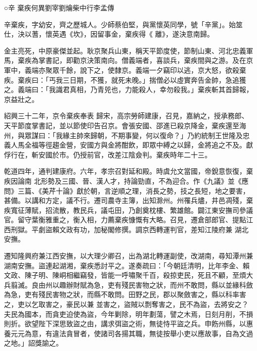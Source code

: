 
\begin{pinyinscope}

 ○辛
 棄疾何異劉宰劉爚柴中行李孟傳



 辛棄疾，字幼安，齊之歷城人。少師蔡伯堅，與黨懷英同學，號「辛黨」。始筮仕，決以蓍，懷英遇《坎》，因留事金，棄疾得《
 離》，遂決意南歸。



 金主亮死，中原豪傑並起。耿京聚兵山東，稱天平節度使，節制山東、河北忠義軍馬，棄疾為掌書記，即勸京決策南向。僧義端者，喜談兵，棄疾間與之游。及在京軍中，義端亦聚眾千餘，說下之，使隸京。義端一夕竊印以逃，京大怒，欲殺棄疾。棄疾曰：「丐我三日期，不獲，就死未晚。」揣僧必以虛實奔告金帥，急追獲之。義端曰：「我識君真相，乃青兕也，力能殺人，幸勿殺我。」棄疾斬其首歸報，京益壯之。



 紹興三十二年，京令棄疾奉表
 歸宋，高宗勞師建康，召見，嘉納之，授承務郎、天平節度掌書記，並以節使印告召京。會張安國、邵進已殺京降金，棄疾還至海州，與眾謀曰：「我緣主帥來歸朝，不期事變，何以復命？」乃約統制王世隆及忠義人馬全福等徑趨金營，安國方與金將酣飲，即眾中縛之以歸，金將追之不及。獻俘行在，斬安國於市。仍授前官，改差江陰僉判。棄疾時年二十三。



 乾道四年，通判建康府。六年，孝宗召對延和殿。時虞允文當國，帝銳意恢復，棄疾因論南
 北形勢及三國、晉、漢人才，持論勁直，不為迎合。作《九議》並《應問》三篇、《美芹十論》獻於朝，言逆順之理，消長之勢，技之長短，地之要害，甚備。以講和方定，議不行。遷司農寺主簿，出知滁州。州罹兵燼，井邑凋殘，棄疾寬征薄賦，招流散，教民兵，議屯田，乃創奠枕樓、繁雄館。闢江東安撫司參議官。留守葉衡雅重之，衡入相，力薦棄疾慷慨有大略。召見，遷倉部郎官、提點江西刑獄。平劇盜賴文政有功，加秘閣修撰。調京西轉運判官，差知江陵府兼
 湖北安撫。



 遷知隆興府兼江西安撫，以大理少卿召，出為湖北轉運副使，改湖南，尋知潭州兼湖南安撫。盜連起湖湘，棄疾悉討平之。遂奏疏曰：「今朝廷清明，比年李金、賴文政、陳子明、陳峒相繼竊發，皆能一呼嘯聚千百，殺掠吏民，死且不顧，至煩大兵翦滅。良由州以趣辦財賦為急，吏有殘民害物之狀，而州不敢問，縣以並緣科斂為急，吏有殘民害物之狀，而縣不敢問。田野之民，郡以聚斂害之，縣以科率害之，吏以乞取害之，豪民以兼
 並害之，盜賊以剽奪害之，民不為盜，去將安之？夫民為國本，而貪吏迫使為盜，今年剿除，明年劃蕩，譬之木焉，日刻月削，不損則折。欲望陛下深思致盜之由，講求弭盜之術，無徒恃平盜之兵。申飭州縣，以惠養元元為意，有違法貪冒者，使諸司各揚其職，無徒按舉小吏以應故事，自為文過之地。」詔獎諭之。




\end{pinyinscope}
